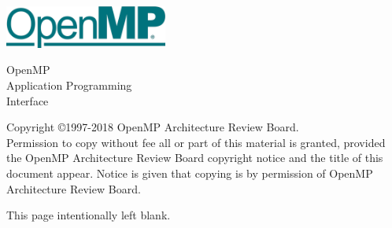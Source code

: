 
  \begin{titlepage}
    \begin{flushleft}
     \hspace{-6em} \includegraphics[width=0.4\textwidth]{openmp-logo.png}
    \end{flushleft}

    \begin{adjustwidth}{-0.75in}{0in}
    \begin{center}
      \Huge
      \textsf{OpenMP\\Application Programming\\Interface}

      \vspace{0.5in}\textsf{    }\vspace{-0.7in}
      \normalsize

      \vspace{1.0in}

      \textbf{\ompversion{}}
    \end{center}
    \end{adjustwidth}

    \vspace{3.0in}

\begin{adjustwidth}{0pt}{1em}\setlength{\parskip}{0.25\baselineskip}%
Copyright \copyright 1997-2018 OpenMP Architecture Review Board.\\
Permission to copy without fee all or part of this material is granted,
provided the OpenMP Architecture Review Board copyright notice and
the title of this document appear. Notice is given that copying is by
permission of OpenMP Architecture Review Board.\end{adjustwidth}

  \end{titlepage}


\clearpage
\thispagestyle{empty}
\phantom{a}
This page intentionally left blank.



\vfill

